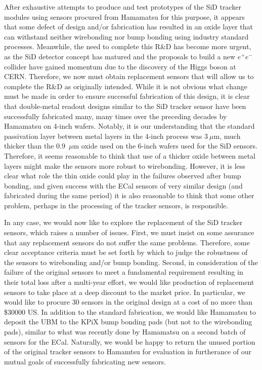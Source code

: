 \documentclass[prc,12pt,nofootinbib,letterpaper]{revtex4}
\begin{document}
After exhaustive attempts to produce and test prototypes of the SiD tracker modules using  sensors procured from Hamamatsu for this purpose, it appears that some defect of design and/or fabrication has resulted in an oxide layer that can withstand neither wirebonding nor bump bonding using industry standard processes.  Meanwhile, the need to complete this R\&D has become more urgent, as the SiD detector concept has matured and the proposals to build a new $e^+e^-$ collider have gained momentum due to the discovery of the Higgs boson at CERN.  Therefore, we now must obtain replacement sensors that will allow us to complete the R\&D as originally intended.  While it is not obvious what change must be made in order to ensure successful fabrication of this design, it is clear that double-metal readout designs similar to the SiD tracker sensor have been successfully fabricated many, many times over the preceding decades by Hamamatsu on 4-inch wafers. Notably, it is our understanding that the standard passivation layer between metal layers in the 4-inch process was 3$~\mu$m, much thicker than the 0.9~$\mu$m oxide used on the 6-inch wafers used for the SiD sensors.    Therefore, it seems reasonable to think that use of a thicker oxide between metal layers might make the sensors more robust to wirebonding.  However, it is less clear what role the thin oxide could play in the failures observed after bump bonding, and given success with the ECal sensors of very similar design (and fabricated during the same period) it is also reasonable to think that some other problem, perhaps in the processing of the tracker sensors, is responsible.

In any case, we would now like to explore the replacement of the SiD tracker sensors, which raises a number of issues.  First, we must insist on some assurance that any replacement sensors do not suffer the same problems. Therefore, some clear acceptance criteria must be set forth by which to judge the robustness of the sensors to wirebonding and/or bump bonding.  Second, in consideration of the failure of the original sensors to meet a fundamental requirement resulting in their total loss after a multi-year effort, we would like production of replacement sensors to take place at a deep discount to the market price.  In particular, we would like to procure 30 sensors in the original design at a cost of no more than \$30000 US. In addition to the standard fabrication, we would like Hamamatsu to deposit the UBM to the KPiX bump bonding pads (but not to the wirebonding pads), similar to what was recently done by Hamamatsu on a second batch of sensors for the ECal. Naturally, we would be happy to return the unused portion of the original tracker sensors to Hamamtsu for evaluation in furtherance of our mutual goals of successfully fabricating new sensors.
\end{document}
